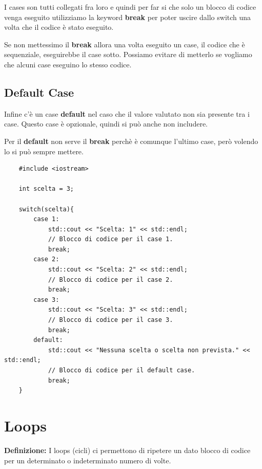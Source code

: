 \textsf{\small I cases son tutti collegati fra loro e quindi per far si che solo un blocco di codice venga eseguito utilizziamo la keyword \textbf{break} per poter uscire dallo switch una volta che il codice è stato eseguito.} 

\textsf{\small Se non mettessimo il \textbf{break} allora una volta eseguito un case, il codice che è sequenziale, eseguirebbe il case sotto. Possiamo evitare di metterlo se vogliamo che alcuni case eseguino lo stesso codice.} \\

\subsection{Default Case}

\textsf{\small Infine c'è un case \textbf{default} nel caso che il valore valutato non sia presente tra i case. Questo case è opzionale, quindi si può anche non includere.}

\textsf{\small Per il \textbf{default} non serve il \textbf{break} perchè è comunque l'ultimo case, però volendo lo si può sempre mettere.} \\

\begin{lstlisting}
	#include <iostream>
	
	int scelta = 3;
	
	switch(scelta){
		case 1:
			std::cout << "Scelta: 1" << std::endl;
			// Blocco di codice per il case 1.
			break;
		case 2:
			std::cout << "Scelta: 2" << std::endl;
			// Blocco di codice per il case 2.
			break;
		case 3:
			std::cout << "Scelta: 3" << std::endl;
			// Blocco di codice per il case 3.
			break;
		default:
			std::cout << "Nessuna scelta o scelta non prevista." << std::endl;
			// Blocco di codice per il default case.
			break;
	}
\end{lstlisting}


\newpage

\section{Loops}

\textsf{\small \textbf{Definizione: } I loops (cicli) ci permettono di ripetere un dato blocco di codice per un determinato o indeterminato numero di volte.} \\

